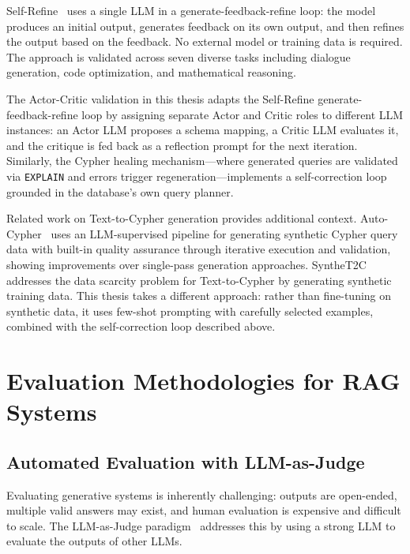 Self-Refine~\cite{madaan2023selfrefineiterativerefinementselffeedback} uses a single LLM in a generate-feedback-refine loop: the model produces an initial output, generates feedback on its own output, and then refines the output based on the feedback. No external model or training data is required. The approach is validated across seven diverse tasks including dialogue generation, code optimization, and mathematical reasoning.

The Actor-Critic validation in this thesis adapts the Self-Refine generate-feedback-refine loop by assigning separate Actor and Critic roles to different LLM instances: an Actor LLM proposes a schema mapping, a Critic LLM evaluates it, and the critique is fed back as a reflection prompt for the next iteration. Similarly, the Cypher healing mechanism---where generated queries are validated via \texttt{EXPLAIN} and errors trigger regeneration---implements a self-correction loop grounded in the database's own query planner.

Related work on Text-to-Cypher generation provides additional context. Auto-Cypher~\cite{tiwari2025autocypherimprovingllmscypher} uses an LLM-supervised pipeline for generating synthetic Cypher query data with built-in quality assurance through iterative execution and validation, showing improvements over single-pass generation approaches. SyntheT2C~\cite{zhong2025synthet2cgeneratingsyntheticdata} addresses the data scarcity problem for Text-to-Cypher by generating synthetic training data. This thesis takes a different approach: rather than fine-tuning on synthetic data, it uses few-shot prompting with carefully selected examples, combined with the self-correction loop described above.

\section{Evaluation Methodologies for RAG Systems}
\label{sec:rw:evaluation}

\subsection{Automated Evaluation with LLM-as-Judge}
\label{sec:rw:llm_judge}

Evaluating generative systems is inherently challenging: outputs are open-ended, multiple valid answers may exist, and human evaluation is expensive and difficult to scale. The LLM-as-Judge paradigm~\cite{zheng2023judgingllmasajudgemtbenchchatbot} addresses this by using a strong LLM to evaluate the outputs of other LLMs.

